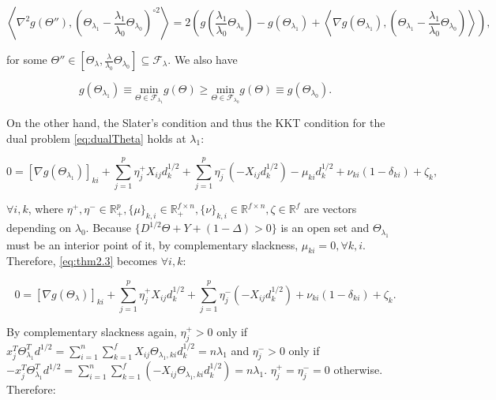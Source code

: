\begin{equation}
    \label{eq:thm2.1}
    \left\langle\nabla^2 g(\Theta''),\left(\Theta_{\lambda_1}-\frac{\lambda_1}{\lambda_0}\Theta_{\lambda_0}\right)^{\circ 2}\right\rangle=2\left(g\left(\frac{\lambda_1}{\lambda_0}\Theta_{\lambda_0}\right)-g(\Theta_{\lambda_1})+\left\langle\nabla g\left(\Theta_{\lambda_1}\right),\left(\Theta_{\lambda_1}-\frac{\lambda_1}{\lambda_0}\Theta_{\lambda_0}\right)\right\rangle\right),
\end{equation}

 for some $\Theta''\in[\Theta_\lambda,\frac{\lambda}{\lambda_0}\Theta_{\lambda_0}]\subseteq \mathcal{F}_\lambda$. We also have

\begin{equation}
    \label{eq:thm2.2}
    g(\Theta_{\lambda_1})\equiv\underset{\Theta\in \mathcal{F}_{\lambda_1}}{\mathrm{min}}g(\Theta)\geq\underset{\Theta\in \mathcal{F}_{\lambda_0}}{\mathrm{min}}g(\Theta)\equiv g\left(\Theta_{\lambda_0}\right).
\end{equation}

On the other hand, the Slater's condition and thus the KKT condition for the dual problem \eqref{eq:dualTheta} holds at $\lambda_1$:

\begin{equation}
    \label{eq:thm2.3}
    0=[\nabla g(\Theta_{\lambda_1})]_{ki}+\sum_{j=1}^p\eta^+_jX_{ij}d_k^{1/2}+\sum_{j=1}^p\eta^-_j(-X_{ij}d_k^{1/2})-\mu_{ki}d_k^{1/2}+\nu_{ki}(1-\delta_{ki})+\zeta_k,
\end{equation}
    
$\forall i,k$, where $\eta^+,\eta^-\in\mathbb{R}^p_+,\{\mu\}_{k,i}\in\mathbb{R}^{f\times n}_+,\{\nu\}_{k,i}\in\mathbb{R}^{f\times n},\zeta\in\mathbb{R}^f$ are vectors depending on $\lambda_0$. Because $\{D^{1/2}\Theta+Y+(1-\Delta)>0\}$ is an open set and $\Theta_{\lambda_1}$ must be an interior point of it, by complementary slackness, $\mu_{ki}=0,\forall k,i$. Therefore, \eqref{eq:thm2.3} becomes $\forall i,k$:

\begin{equation}
    \label{eq:thm2.4}
    0=[\nabla g(\Theta_{\lambda})]_{ki}+\sum_{j=1}^p\eta^+_jX_{ij}d_k^{1/2}+\sum_{j=1}^p\eta^-_j(-X_{ij}d_k^{1/2})+\nu_{ki}(1-\delta_{ki})+\zeta_k.
\end{equation}

By complementary slackness again, $\eta^+_j>0$ only if $x_j^T\Theta_{\lambda_1}^Td^{1/2}=\sum_{i=1}^n\sum_{k=1}^fX_{ij}\Theta_{\lambda_1,ki}d_k^{1/2}=n\lambda_1$ and $\eta^-_j>0$ only if $-x_j^T\Theta_{\lambda_1}^Td^{1/2}=\sum_{i=1}^n\sum_{k=1}^f(-X_{ij}\Theta_{\lambda_1,ki}d_k^{1/2})=n\lambda_1$. $\eta^+_j=\eta^-_j=0$ otherwise. Therefore:

